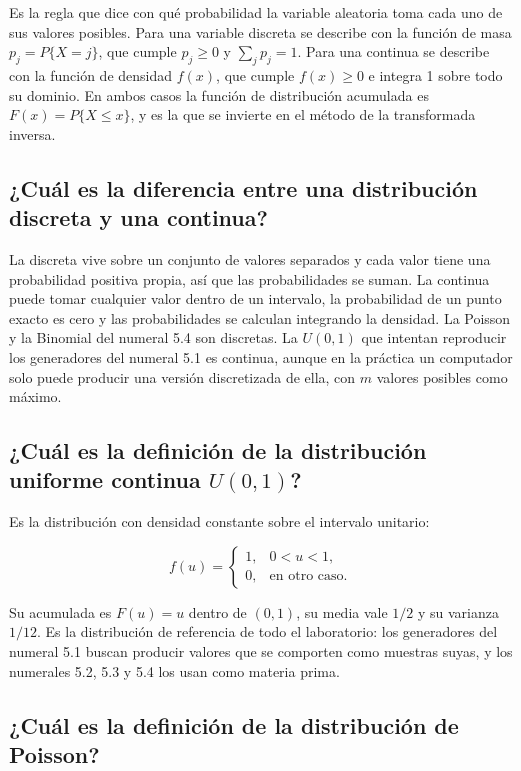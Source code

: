 \documentclass[11pt,letterpaper]{article}
\begin{document}
Es la regla que dice con qué probabilidad la variable aleatoria toma cada uno de sus valores
posibles. Para una variable discreta se describe con la función de masa $p_j = P\{X = j\}$, que
cumple $p_j \ge 0$ y $\sum_j p_j = 1$. Para una continua se describe con la función de densidad
$f(x)$, que cumple $f(x) \ge 0$ e integra 1 sobre todo su dominio. En ambos casos la función de
distribución acumulada es $F(x) = P\{X \le x\}$, y es la que se invierte en el método de la
transformada inversa.

\subsection{¿Cuál es la diferencia entre una distribución discreta y una continua?}

La discreta vive sobre un conjunto de valores separados y cada valor tiene una probabilidad positiva
propia, así que las probabilidades se suman. La continua puede tomar cualquier valor dentro de un
intervalo, la probabilidad de un punto exacto es cero y las probabilidades se calculan integrando la
densidad. La Poisson y la Binomial del numeral 5.4 son discretas. La $U(0,1)$ que intentan reproducir
los generadores del numeral 5.1 es continua, aunque en la práctica un computador solo puede producir
una versión discretizada de ella, con $m$ valores posibles como máximo.

\subsection{¿Cuál es la definición de la distribución uniforme continua $U(0,1)$?}

Es la distribución con densidad constante sobre el intervalo unitario:

\[
f(u) =
\begin{cases}
1, & 0 < u < 1,\\
0, & \text{en otro caso.}
\end{cases}
\]

Su acumulada es $F(u) = u$ dentro de $(0,1)$, su media vale $1/2$ y su varianza $1/12$. Es la
distribución de referencia de todo el laboratorio: los generadores del numeral 5.1 buscan producir
valores que se comporten como muestras suyas, y los numerales 5.2, 5.3 y 5.4 los usan como materia
prima.

\subsection{¿Cuál es la definición de la distribución de Poisson?}
\end{document}
